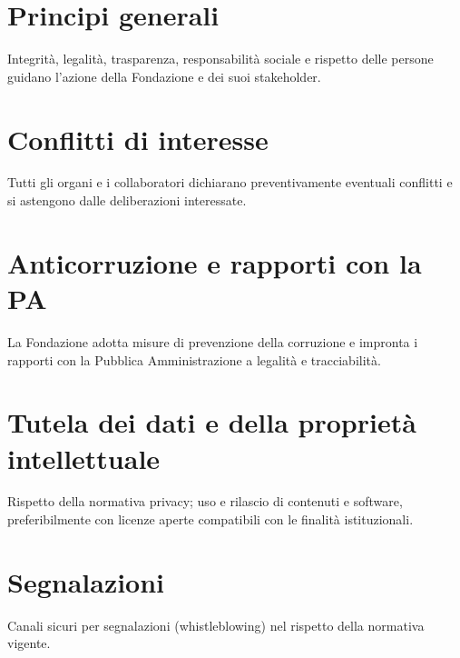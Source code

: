 \maketitle

\section*{Principi generali}
Integrità, legalità, trasparenza, responsabilità sociale e rispetto delle persone guidano l'azione della Fondazione e dei suoi stakeholder.

\section*{Conflitti di interesse}
Tutti gli organi e i collaboratori dichiarano preventivamente eventuali conflitti e si astengono dalle deliberazioni interessate.

\section*{Anticorruzione e rapporti con la PA}
La Fondazione adotta misure di prevenzione della corruzione e impronta i rapporti con la Pubblica Amministrazione a legalità e tracciabilità.

\section*{Tutela dei dati e della proprietà intellettuale}
Rispetto della normativa privacy; uso e rilascio di contenuti e software, preferibilmente con licenze aperte compatibili con le finalità istituzionali.

\section*{Segnalazioni}
Canali sicuri per segnalazioni (whistleblowing) nel rispetto della normativa vigente.

